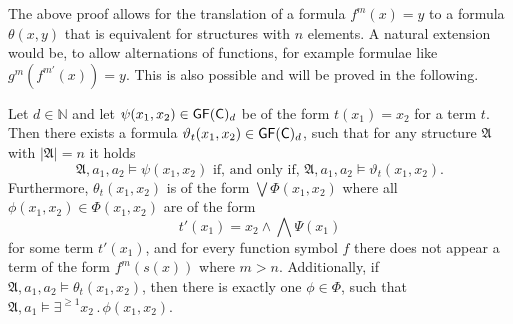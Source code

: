 The above proof allows for the translation of a formula $f^m(x)=y$ to a formula $\theta(x,y)$ that is equivalent for structures with $n$ elements.
A natural extension would be, to allow alternations of functions, for example formulae like $g^m(f^{m'}(x))=y$.
This is also possible and will be proved in the following.

\begin{lemma}
	Let $d\in\mathbb N$ and let $\psi(x_1,x_2)\in \mathsf{GF}(\mathsf{C})_d$ be of the form $t(x_1)=x_2$ for a term $t$.
	Then there exists a formula $\vartheta_{t}(x_1,x_2)\in\mathsf{GF}(\mathsf{C})_d$, such that for any structure $\mathfrak A$ with $\vert \mathfrak A \vert = n$ it holds
	$$\mathfrak A,a_1,a_2 \models \psi(x_1,x_2) \text{ if, and only if, } \mathfrak A,a_1,a_2 \models \vartheta_{t}(x_1,x_2).$$ 
	Furthermore, $\theta_{t}(x_1,x_2)$ is of the form $\bigvee \Phi(x_1,x_2)$ where all $\phi(x_1,x_2)\in\Phi(x_1,x_2)$ are of the form
	$$t'(x_1)=x_2 \land \bigwedge \Psi(x_1)$$ 
	for some term $t'(x_1)$, and for every function symbol $f$ there does not appear a term of the form $f^m(s(x))$ where $m > n$.
	Additionally, if $\mathfrak A,a_1,a_2\models \theta_{t}(x_1,x_2)$, then there is exactly one $\phi\in\Phi$, such that $\mathfrak A,a_1\models \exists^{\geq 1}x_2\operatorname{.}\phi(x_1,x_2)$.
	\label{TranslationOfArbTerms}
\end{lemma}
